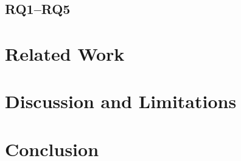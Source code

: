 \documentclass[sigconf,anonymous,review]{acmart}
\begin{document}
\subsection{RQ1--RQ5}\label{sec:eval:rq}

\section{Related Work}\label{sec:related}

\section{Discussion and Limitations}\label{sec:disc}

\section{Conclusion}\label{sec:conc}

% 
% 
\end{document}
